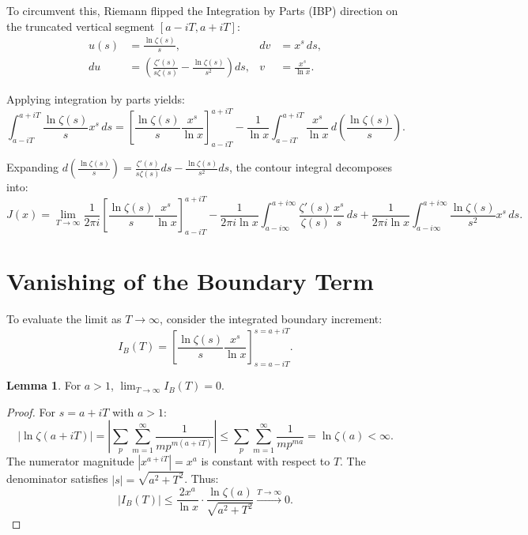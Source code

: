 \documentclass[11pt,a4paper]{article}
\theoremstyle{definition}
\newtheorem{lemma}{Lemma}
\begin{document}
To circumvent this, Riemann flipped the Integration by Parts (IBP) direction on the truncated vertical segment $[a - iT, a + iT]$:
\begin{align*}
    u(s) &= \frac{\ln \zeta(s)}{s}, & dv &= x^s \, ds, \\[1ex]
    du &= \left( \frac{\zeta'(s)}{s \zeta(s)} - \frac{\ln \zeta(s)}{s^2} \right) ds, & v &= \frac{x^s}{\ln x}.
\end{align*}

Applying integration by parts yields:
\begin{equation}
    \int_{a - iT}^{a + iT} \frac{\ln \zeta(s)}{s} x^s \, ds = \left[ \frac{\ln \zeta(s)}{s} \frac{x^s}{\ln x} \right]_{a - iT}^{a + iT} - \frac{1}{\ln x} \int_{a - iT}^{a + iT} \frac{x^s}{\ln x} \, d\left( \frac{\ln \zeta(s)}{s} \right).
\end{equation}

Expanding $d\left( \frac{\ln \zeta(s)}{s} \right) = \frac{\zeta'(s)}{s \zeta(s)} ds - \frac{\ln \zeta(s)}{s^2} ds$, the contour integral decomposes into:
\begin{equation}
    J(x) = \lim_{T \to \infty} \frac{1}{2\pi i} \left[ \frac{\ln \zeta(s)}{s} \frac{x^s}{\ln x} \right]_{a - iT}^{a + iT} - \frac{1}{2\pi i \ln x} \int_{a - i\infty}^{a + i\infty} \frac{\zeta'(s)}{\zeta(s)} \frac{x^s}{s} \, ds + \frac{1}{2\pi i \ln x} \int_{a - i\infty}^{a + i\infty} \frac{\ln \zeta(s)}{s^2} x^s \, ds.
\end{equation}

\section{Vanishing of the Boundary Term}

To evaluate the limit as $T \to \infty$, consider the integrated boundary increment:
\begin{equation}
    I_B(T) = \left[ \frac{\ln \zeta(s)}{s} \frac{x^s}{\ln x} \right]_{s = a - iT}^{s = a + iT}.
\end{equation}

\begin{lemma}
For $a > 1$, $\lim_{T \to \infty} I_B(T) = 0$.
\end{lemma}

\begin{proof}
For $s = a + iT$ with $a > 1$:
\[
|\ln \zeta(a + iT)| = \left| \sum_{p} \sum_{m=1}^{\infty} \frac{1}{m p^{m(a + iT)}} \right| \le \sum_{p} \sum_{m=1}^{\infty} \frac{1}{m p^{ma}} = \ln \zeta(a) < \infty.
\]
The numerator magnitude $|x^{a + iT}| = x^a$ is constant with respect to $T$. The denominator satisfies $|s| = \sqrt{a^2 + T^2}$. Thus:
\[
|I_B(T)| \le \frac{2 x^a}{\ln x} \cdot \frac{\ln \zeta(a)}{\sqrt{a^2 + T^2}} \xrightarrow{T \to \infty} 0.
\]
\end{proof}
\end{document}
